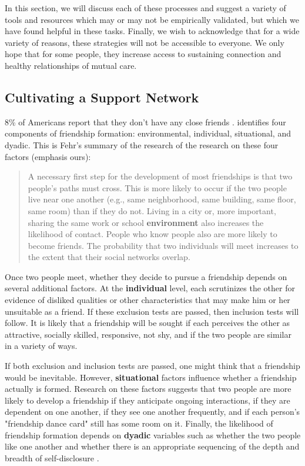 \documentclass[12pt,letterpaper]{book}
\begin{document}
In this section, we will discuss each of these processes and suggest a variety of tools and resources which may or may not be empirically validated, but which we have found helpful in these tasks. Finally, we wish to acknowledge that for a wide variety of reasons, these strategies will not be accessible to everyone. We only hope that for some people, they increase access to sustaining connection and healthy relationships of mutual care.

\subsection*{Cultivating a Support Network}

8\% of Americans report that they don't have any close friends \cite{pewFriends}. \textcite{fehr2008friendship} identifies four components of friendship formation: environmental, individual, situational, and dyadic. This is Fehr's summary of the research of the research on these four factors (emphasis ours):

\begin{quotation}
	A necessary first step for the development of most friendships is that two people's paths must cross. This is more likely to occur if the two people live near one another (e.g., same neighborhood, same building, same floor, same room) than if they do not. Living in a city or, more important, sharing the same work or school \textbf{environment} also increases the likelihood of contact. People who know people also are more likely to become friends. The probability that two individuals will meet increases to the extent that their social networks overlap.
\end{quotation}

Once two people meet, whether they decide to pursue a friendship depends on several additional factors. At the \textbf{individual} level, each scrutinizes the other for evidence of disliked qualities or other characteristics that may make him or her unsuitable as a friend. If these exclusion tests are passed, then inclusion tests will follow. It is likely that a friendship will be sought if each perceives the other as attractive, socially skilled, responsive, not shy, and if the two people are similar in a variety of ways.

If both exclusion and inclusion tests are passed, one might think that a friendship would be inevitable. However, \textbf{situational} factors influence whether a friendship actually is formed. Research on these factors suggests that two people are more likely to develop a friendship if they anticipate ongoing interactions, if they are dependent on one another, if they see one another frequently, and if each person's "friendship dance card" still has some room on it. Finally, the likelihood of friendship formation depends on \textbf{dyadic} variables such as whether the two people like one another and whether there is an appropriate sequencing of the depth and breadth of self-disclosure \cite[p. 68]{fehr2008friendship}.
\end{document}
